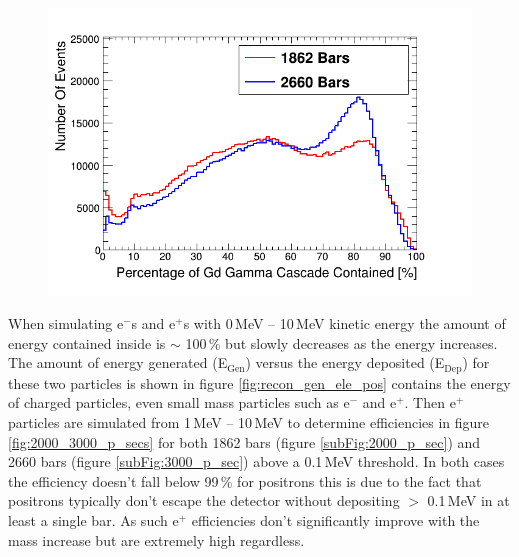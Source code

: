 \begin{figure}[!h]
 \centering
 \includegraphics[width=0.7\linewidth]{Chapter4/Figs/cascadeContainmentCompare.png}
 \label{fig:containment_comparison}
\end{figure} 

When simulating e$^-$s and e$^+$s with 0\,MeV -- 10\,MeV kinetic energy the amount of energy contained inside is $\sim$ 100\,\% but slowly decreases as the energy increases. The amount of energy generated (E$_\textrm{{Gen}}$) versus the energy deposited  (E$_\textrm{{Dep}}$) for these two particles is shown in figure \ref{fig:recon_gen_ele_pos} contains the energy of charged particles, even small mass particles such as e$^-$ and e$^+$. Then e$^+$ particles are simulated from 1\,MeV -- 10\,MeV to determine efficiencies in figure \ref{fig:2000_3000_p_secs} for both 1862 bars (figure \ref{subFig:2000_p_sec}) and 2660 bars (figure \ref{subFig:3000_p_sec}) above a 0.1\,MeV threshold. In both cases the efficiency doesn't fall below 99\,\% for positrons this is due to the fact that positrons typically don't escape the detector without depositing $>$ 0.1\,MeV in at least a single bar. As such e$^+$ efficiencies don't significantly improve with the mass increase but are extremely high regardless.  

